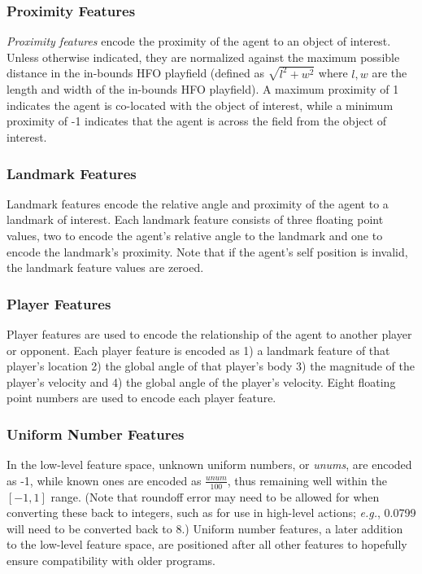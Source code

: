 \documentclass[12pt]{article}
\begin{document}
\subsubsection{Proximity Features}
\textit{Proximity features} encode the proximity of the agent to an
object of interest. Unless otherwise indicated, they are normalized
against the maximum possible distance in the in-bounds HFO playfield (defined as
$\sqrt{l^2 + w^2}$ where $l,w$ are the length and width of the in-bounds HFO
playfield). A maximum proximity of 1 indicates the agent is co-located
with the object of interest, while a minimum proximity of -1 indicates
that the agent is across the field from the object of interest.

\subsubsection{Landmark Features}
Landmark features encode the relative angle and proximity of the agent
to a landmark of interest. Each landmark feature consists of three
floating point values, two to encode the agent's relative angle to the
landmark and one to encode the landmark's proximity. Note that if the
agent's self position is invalid, the landmark feature values are
zeroed.

\subsubsection{Player Features}
Player features are used to encode the relationship of the agent to
another player or opponent. Each player feature is encoded as 1) a
landmark feature of that player's location 2) the global angle of that
player's body 3) the magnitude of the player's velocity and 4) the
global angle of the player's velocity. Eight floating point numbers
are used to encode each player feature.

\subsubsection{Uniform Number Features}
In the low-level feature space, unknown uniform numbers, or \textit{unums},
are encoded as -1, while known ones are encoded as $\frac{unum}{100}$, thus
remaining well within the $[-1, 1]$ range. (Note that roundoff error may need
to be allowed for when converting these back to integers, such as for use in
high-level actions; \textit{e.g.}, 0.0799 will need to be converted back to 8.)
Uniform number features, a later addition to the low-level feature space,
are positioned after all other features to hopefully ensure compatibility
with older programs.
\end{document}

